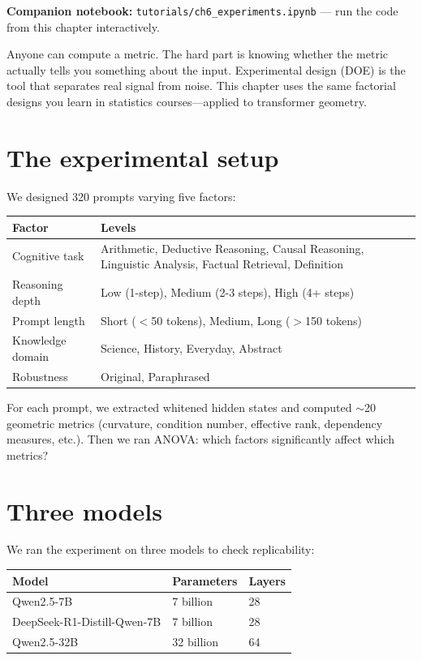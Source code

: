 \documentclass[11pt, twoside, openright]{memoir}
\newcommand{\notebook}[1]{%
  \begin{tcolorbox}[enhanced, colback=LBlue!30, colframe=Blue!60,
    left=4pt, right=4pt, top=3pt, bottom=3pt, boxrule=0.6pt, arc=2pt,
    before skip=6pt, after skip=10pt]
    {\small\sffamily\color{Navy} \textbf{Companion notebook:}
    \texttt{tutorials/#1} --- run the code from this chapter interactively.}
  \end{tcolorbox}%
}
\begin{document}
\notebook{ch6\_experiments.ipynb}

\begin{whycare}
Anyone can compute a metric. The hard part is knowing whether the metric
actually tells you something about the input. Experimental design (DOE) is
the tool that separates real signal from noise. This chapter uses the same
factorial designs you learn in statistics courses---applied to transformer
geometry.
\end{whycare}

\section{The experimental setup}

We designed 320 prompts varying five factors:

\begin{center}
\renewcommand{\arraystretch}{1.4}\small
\begin{tabular}{@{}L{3cm} L{6cm}@{}}
\toprule
\textbf{Factor} & \textbf{Levels} \\
\midrule
Cognitive task & Arithmetic, Deductive Reasoning, Causal Reasoning,
  Linguistic Analysis, Factual Retrieval, Definition \\
Reasoning depth & Low (1-step), Medium (2-3 steps), High (4+ steps) \\
Prompt length & Short ($<$50 tokens), Medium, Long ($>$150 tokens) \\
Knowledge domain & Science, History, Everyday, Abstract \\
Robustness & Original, Paraphrased \\
\bottomrule
\end{tabular}
\end{center}

For each prompt, we extracted whitened hidden states and computed $\sim$20
geometric metrics (curvature, condition number, effective rank, dependency
measures, etc.). Then we ran ANOVA: which factors significantly affect which
metrics?

\section{Three models}

We ran the experiment on three models to check replicability:

\begin{center}
\renewcommand{\arraystretch}{1.3}
\begin{tabular}{@{}lll@{}}
\toprule
\textbf{Model} & \textbf{Parameters} & \textbf{Layers} \\
\midrule
Qwen2.5-7B & 7 billion & 28 \\
DeepSeek-R1-Distill-Qwen-7B & 7 billion & 28 \\
Qwen2.5-32B & 32 billion & 64 \\
\bottomrule
\end{tabular}
\end{center}
\end{document}
